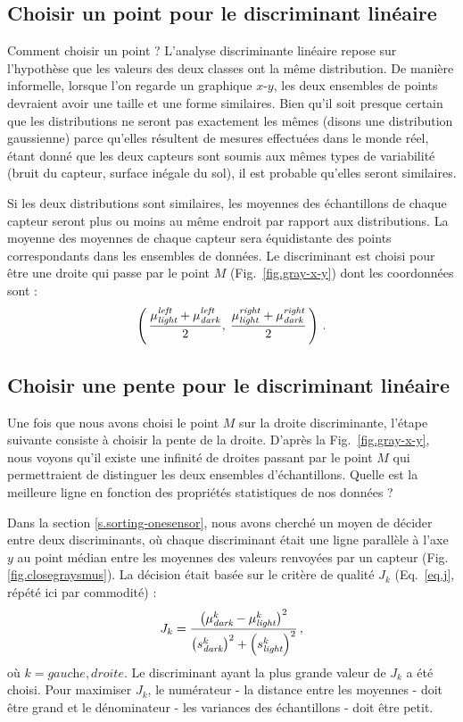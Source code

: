 \subsection{Choisir un point pour le discriminant linéaire}

Comment choisir un point ? L'analyse discriminante linéaire repose sur l'hypothèse que les valeurs des deux classes ont la même distribution. De manière informelle, lorsque l'on regarde un graphique $x$-$y$, les deux ensembles de points devraient avoir une taille et une forme similaires. Bien qu'il soit presque certain que les distributions ne seront pas exactement les mêmes (disons une distribution gaussienne) parce qu'elles résultent de mesures effectuées dans le monde réel, étant donné que les deux capteurs sont soumis aux mêmes types de variabilité (bruit du capteur, surface inégale du sol), il est probable qu'elles seront similaires.

Si les deux distributions sont similaires, les moyennes des échantillons de chaque capteur seront plus ou moins au même endroit par rapport aux distributions. La moyenne des moyennes de chaque capteur sera équidistante des points correspondants dans les ensembles de données. Le discriminant est choisi pour être une droite qui passe par le point $M$ (Fig.~\ref{fig.gray-x-y}) dont les coordonnées sont :
\[
\left(\,
\frac{\mu_{\textit{\scriptsize light}}^{\textit{\scriptsize left }}+\mu_{\textit{\scriptsize dark}}^{\textit{\scriptsize left }}}{2},\:\frac{\mu_{\textit{\scriptsize light}}^{\textit{\scriptsize right}}+\mu_{\textit{\scriptsize dark}}^{\textit{\scriptsize right}}}{2}
\,\right)\,.
\]

\subsection{Choisir une pente pour le discriminant linéaire}

Une fois que nous avons choisi le point $M$ sur la droite discriminante, l'étape suivante consiste à choisir la pente de la droite. D'après la Fig.~\ref{fig.gray-x-y}, nous voyons qu'il existe une infinité de droites passant par le point $M$ qui permettraient de distinguer les deux ensembles d'échantillons. Quelle est la meilleure ligne en fonction des propriétés statistiques de nos données ?

Dans la section \ref{s.sorting-onesensor}, nous avons cherché un moyen de décider entre deux discriminants, où chaque discriminant était une ligne parallèle à l'axe $y$ au point médian entre les moyennes des valeurs renvoyées par un capteur (Fig.\ref{fig.closegraysmus}). La décision était basée sur le critère de qualité $J_k$ (Eq.~\ref{eq.j}, répété ici par commodité) :
\begin{equation}
J_k = \frac{\left(\mu_{\textit{\scriptsize dark}}^k - \mu_{\textit{\scriptsize light}}^k\right)^2}{\left(s_{\textit{\scriptsize dark}}^k\right)^2 + \left(s_{\textit{\scriptsize light}}^k\right)^2}\,,\label{eq.j-repeat}
\end{equation}
où $k=\textit{gauche},\textit{droite}$. Le discriminant ayant la plus grande valeur de $J_k$ a été choisi. Pour maximiser $J_k$, le numérateur - la distance entre les moyennes - doit être grand et le dénominateur - les variances des échantillons - doit être petit.


